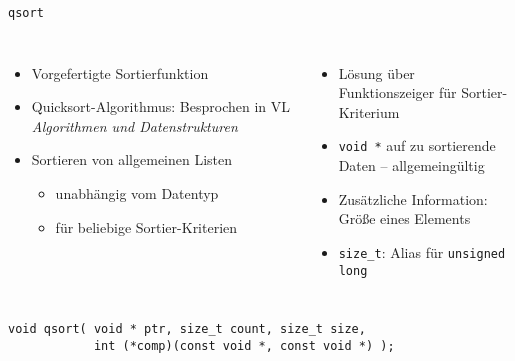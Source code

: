 \begin{frame}[fragile]{\texttt{qsort}}
%
\begin{columns}[T]
\begin{itemize}
\item Vorgefertigte Sortierfunktion
\item Quicksort-Algorithmus: Besprochen in VL \emph{Algorithmen und Datenstrukturen}
\item Sortieren von allgemeinen Listen
	\begin{itemize}
	\item unabhängig vom Datentyp
	\item für beliebige Sortier-Kriterien
	\end{itemize}
\end{itemize}
%
\begin{itemize}
\item Lösung über Funktionszeiger für Sortier-Kriterium
\item \texttt{void *} auf zu sortierende Daten -- allgemeingültig
\item Zusätzliche Information: Größe eines Elements
\item \texttt{size_t}: Alias für \texttt{unsigned long}  
\end{itemize}
\end{columns}
%
\begin{codebox}
\begin{verbatim}
void qsort( void * ptr, size_t count, size_t size,
            int (*comp)(const void *, const void *) );
\end{verbatim}
\end{codebox}
%
\end{frame}


